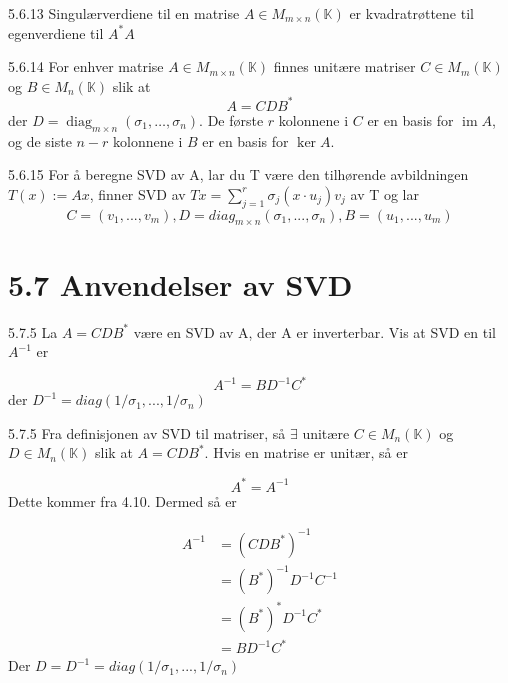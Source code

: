 \documentclass[a4paper,norsk]{article}
\begin{document}
\begin{definitionbox}{5.6.13}{}
Singulærverdiene til en matrise $ A \in M_{m \times n}(\mathbb{K})  $ er kvadratrøttene til egenverdiene til $ A^*A $ 
\end{definitionbox}


\begin{theorembox}{5.6.14}{}
For enhver matrise $ A \in M_{m \times n} (\mathbb{K}) $ finnes unitære matriser $ C \in M_m(\mathbb{K}) $ og $ B \in M_n(\mathbb{K}) $  slik at
\[
    A = CDB^*
\]
der $ D = \operatorname{diag}_{m \times n}\left( \sigma_1, \dots, \sigma_n \right) $. 
De første $r$ kolonnene i $C$ er en basis for $\operatorname{im} A$, 
og de siste $n - r$ kolonnene i $B$ er en basis for $\ker A$.
\end{theorembox}


\begin{algoritme}{5.6.15}
For å beregne SVD av A, lar du T være den tilhørende avbildningen $ T (x) := Ax $, finner SVD av $ Tx = \sum_{ j=1 }^{ r } \sigma _{ j} \left( x \cdot u_j \right) v_j  $  av T og lar
\[
    C = \left( v_1, ..., v_m \right), D = diag_{m \times n} \left( \sigma _{ 1} , ..., \sigma _{ n}  \right), B = \left( u_1, ..., u_m \right) 
\]
\end{algoritme}

\section*{5.7 Anvendelser av SVD}

\begin{oppgavebox}{5.7.5}{}
La $ A = CDB^* $ være en SVD av A, der A er inverterbar. Vis at SVD en til $ A^{-1} $ er

\[
    A^{-1} = BD^{-1} C^*
\]
der $ D^{-1} = diag \left( 1 / \sigma _{ 1} , ..., 1/ \sigma _{ n}  \right)  $ 
\begin{proofbox}{5.7.5}{}
Fra definisjonen av SVD til matriser, så $ \exists $ unitære $ C \in M_n(\mathbb{K}) $ og $ D \in M_n(\mathbb{K}) $  slik at $ A = CDB^* $. Hvis en matrise er unitær, så er

\[
    A^* = A^{-1}
\]
Dette kommer fra 4.10. Dermed så er 

\begin{align*}
    A^{-1} &= \left( CDB^* \right) ^{-1} \\
    &= \left( B^* \right) ^{-1} D^{-1} C^{-1} \\
    &= \left( B^* \right) ^* D^{-1} C^* \\
    &= B D^{-1} C^*
\end{align*}
Der $ D = D^{-1} = diag \left( 1 / \sigma _{ 1} , ..., 1/ \sigma _{ n}  \right) $ 
\end{proofbox}
\end{oppgavebox}
\end{document}
